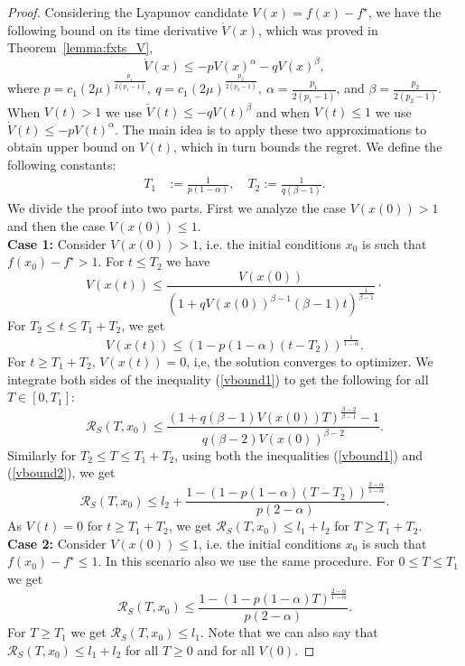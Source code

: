 \documentclass[letterpaper]{article}
\begin{document}
\begin{proof}
Considering the Lyapunov candidate $V(x)=f(x)-f^\star$, we have the following bound on its time derivative $\dot{V}(x)$, which was proved in Theorem~\ref{lemma:fxts_V}, \begin{equation}
\dot{V}(x) \leq -pV(x)^{\alpha} -qV(x)^{\beta},
\end{equation}
where $p=c_1(2\mu)^{\frac{p_1}{2(p_1 -1)}},\: q=c_1(2\mu)^{\frac{p_2}{2(p_2 -1)}},\: \alpha= \frac{p_1}{2(p_1 -1)}$, and $\beta= \frac{p_2}{2(p_2 -1)}$.
When $V(t)> 1$ we use $\dot{V}(t)\leq -qV(t)^{\beta}$ and when $V(t)\leq 1$ we use $\dot{V}(t)\leq -pV(t)^{\alpha}$. The main idea is to apply these two approximations to obtain upper bound on $V(t)$, which in turn bounds the regret. We define the following constants:
\begin{align*}
T_1 &:= \frac{1}{p(1-\alpha)}, \quad T_2:= \frac{1}{q(\beta-1)}.
\end{align*}
We divide the proof into two parts. First we analyze the case $V(x(0))>1$ and then the case $V(x(0))\leq 1$. \\
\textbf{Case 1:} Consider $V(x(0))>1$, i.e. the initial conditions $x_0$ is such that $f(x_0)-f^\star>1$. For $t\leq T_2$ we have
\begin{equation} \label{vbound1}
V(x(t))\leq \frac{V(x(0))}{\left( 1+qV(x(0))^{\beta-1}(\beta-1)t\right)^{\frac{1}{\beta-1}}}\cdot
\end{equation}
For $T_2 \leq t\leq T_1+T_2$, we get
\begin{equation} \label{vbound2}
V(x(t))\leq \left(1-p(1-\alpha)(t-T_2)\right)^{\frac{1}{1-\alpha}}.
\end{equation}
For $t\geq T_1+T_2$, $V(x(t))=0$, i,e, the solution converges to optimizer. We integrate both sides of the inequality (\ref{vbound1}) to get the following for all $T\in[0,T_1]$:
\begin{equation*}
\mathcal{R}_S(T,x_0)\leq \frac{(1+q(\beta-1)V(x(0))T)^{\frac{\beta-2}{\beta-1}}-1}{q(\beta-2)V(x(0))^{\beta-2}}.
\end{equation*}
Similarly for $T_2\leq T\leq T_1+T_2$, using both the inequalities (\ref{vbound1}) and (\ref{vbound2}), we get
\begin{equation*}
\mathcal{R}_S(T,x_0)\leq l_2 + \frac{1-\left(1-p(1-\alpha)(T-T_2) \right)^{\frac{2-\alpha}{1-\alpha}}}{p(2-\alpha)} .
\end{equation*}
As $V(t)=0$ for $t\geq T_1+T_2$, we get $\mathcal{R}_S(T,x_0)\leq l_1+l_2$ for $T\geq T_1+T_2$. \\
\textbf{Case 2:} Consider $V(x(0))\leq1$, i.e. the initial conditions $x_0$ is such that $f(x_0)-f^\star\leq1$. In this scenario also we use the same procedure. For $0\leq T\leq T_1$ we get
\begin{equation*}
\mathcal{R}_S(T,x_0)\leq  \frac{1-\left(1-p(1-\alpha)T \right)^{\frac{2-\alpha}{1-\alpha}}}{p(2-\alpha)} .
\end{equation*}
For $T\geq T_1$ we get $\mathcal{R}_S (T,x_0) \leq l_1$. Note that we can also say that $\mathcal{R}_S(T,x_0)\leq l_1+l_2$ for all $T\geq0$ and for all $V(0)$.
\end{proof}
\end{document}
